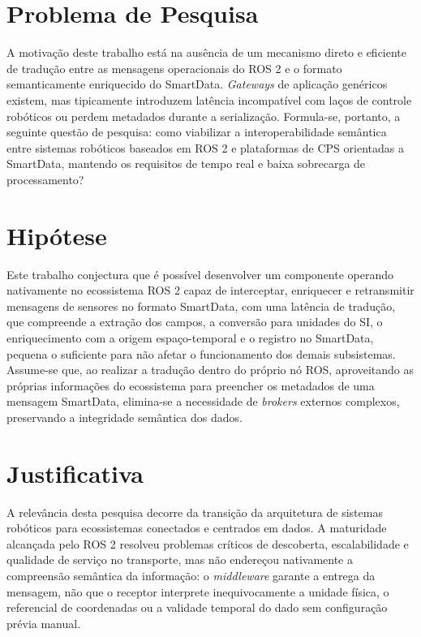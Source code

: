 \documentclass[
    12pt,
    oneside,
    a4paper,
    chapter=TITLE,
    section=TITLE,
    english,
    brazil
]{abntex2}
\begin{document}
\section{Problema de Pesquisa}
\label{sec:problema}

A motivação deste trabalho está na ausência de um mecanismo direto e
eficiente de tradução entre as mensagens operacionais do ROS 2 e o formato
semanticamente enriquecido do SmartData. \textit{Gateways} de aplicação
genéricos existem, mas tipicamente introduzem latência incompatível com
laços de controle robóticos ou perdem metadados durante a serialização.
Formula-se, portanto, a seguinte questão de pesquisa: como viabilizar a
interoperabilidade semântica entre sistemas robóticos baseados em ROS 2 e
plataformas de CPS orientadas a SmartData, mantendo os requisitos de tempo
real e baixa sobrecarga de processamento?

\section{Hipótese}
\label{sec:hipotese}

Este trabalho conjectura que é possível desenvolver um componente operando
nativamente no ecossistema ROS 2 capaz de interceptar, enriquecer e
retransmitir mensagens de sensores no formato SmartData, com uma latência
de tradução, que compreende a extração dos campos, a conversão para
unidades do SI, o enriquecimento com a origem espaço-temporal e o registro
no SmartData, pequena o suficiente para não afetar o funcionamento
dos demais subsistemas. Assume-se que, ao realizar a tradução dentro do
próprio nó ROS, aproveitando as próprias informações do ecossistema
para preencher os metadados de uma mensagem
SmartData, elimina-se a necessidade de \textit{brokers} externos
complexos, preservando a integridade semântica dos dados.

\section{Justificativa}
\label{sec:justificativa}

A relevância desta pesquisa decorre da transição da arquitetura de sistemas
robóticos para ecossistemas conectados e centrados em dados. A maturidade
alcançada pelo ROS 2 \cite{macenski2022ros2} resolveu problemas críticos
de descoberta, escalabilidade e qualidade de serviço no transporte, mas
não endereçou nativamente a compreensão semântica da informação: o
\textit{middleware} garante a entrega da mensagem, não que o receptor
interprete inequivocamente a unidade física, o referencial de coordenadas
ou a validade temporal do dado sem configuração prévia manual.
\end{document}
